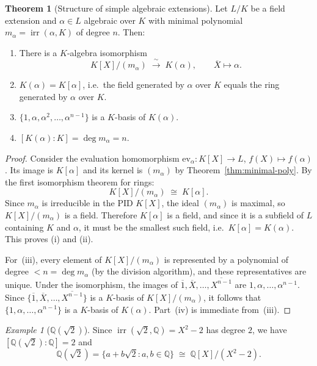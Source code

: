 \documentclass[12pt,a4paper,openany]{book}
\theoremstyle{definition}
\newtheorem{theorem}{Theorem}[chapter]
\theoremstyle{remark}
\newtheorem{example}{Example}[chapter]
\newcommand{\Q}{\mathbb{Q}}
\renewcommand{\deg}{\operatorname{deg}}
\DeclareMathOperator{\irr}{irr}
\begin{document}
\begin{theorem}[Structure of simple algebraic extensions]
\label{thm:simple-extension-structure}
Let $L/K$ be a field extension and $\alpha \in L$ algebraic over $K$
with minimal polynomial $m_\alpha = \irr(\alpha, K)$ of degree $n$.
Then:
\begin{enumerate}[label=(\roman*)]
  \item There is a $K$-algebra isomorphism
    \[
      K[X]/(m_\alpha) \;\xrightarrow{\;\sim\;}\; K(\alpha),
      \qquad \overline{X} \longmapsto \alpha.
    \]
  \item $K(\alpha) = K[\alpha]$, i.e.\ the field generated by
    $\alpha$ over $K$ equals the ring generated by $\alpha$ over $K$.
  \item $\{1, \alpha, \alpha^2, \dots, \alpha^{n-1}\}$ is a
    $K$-basis of $K(\alpha)$.
  \item $[K(\alpha) : K] = \deg m_\alpha = n$.
\end{enumerate}
\end{theorem}

\begin{proof}
Consider the evaluation homomorphism
$\mathrm{ev}_\alpha \colon K[X] \to L$, $f(X) \mapsto f(\alpha)$.
Its image is $K[\alpha]$ and its kernel is $(m_\alpha)$ by
Theorem~\ref{thm:minimal-poly}. By the first isomorphism theorem
for rings:
\[
  K[X]/(m_\alpha) \;\cong\; K[\alpha].
\]
Since $m_\alpha$ is irreducible in the PID $K[X]$, the ideal
$(m_\alpha)$ is maximal, so $K[X]/(m_\alpha)$ is a field. Therefore
$K[\alpha]$ is a field, and since it is a subfield of $L$ containing
$K$ and $\alpha$, it must be the smallest such field, i.e.\
$K[\alpha] = K(\alpha)$. This proves (i) and (ii).

For~(iii), every element of $K[X]/(m_\alpha)$ is represented by a
polynomial of degree $< n = \deg m_\alpha$ (by the division algorithm),
and these representatives are unique. Under the isomorphism, the
images of $\overline{1}, \overline{X}, \dots, \overline{X^{n-1}}$ are
$1, \alpha, \dots, \alpha^{n-1}$. Since
$\{\overline{1}, \overline{X}, \dots, \overline{X^{n-1}}\}$ is a
$K$-basis of $K[X]/(m_\alpha)$, it follows that
$\{1, \alpha, \dots, \alpha^{n-1}\}$ is a $K$-basis of $K(\alpha)$.
Part~(iv) is immediate from~(iii).
\end{proof}

\begin{example}[$\Q(\sqrt{2})$]
\label{ex:Q-sqrt2}
\index{Q(sqrt2)@$\Q(\sqrt{2})$}
Since $\irr(\sqrt{2}, \Q) = X^2 - 2$ has degree $2$, we have
$[\Q(\sqrt{2}):\Q] = 2$ and
\[
  \Q(\sqrt{2}) = \{ a + b\sqrt{2} : a, b \in \Q \}
  \;\cong\; \Q[X]/(X^2 - 2).
\]
\end{example}
\end{document}
